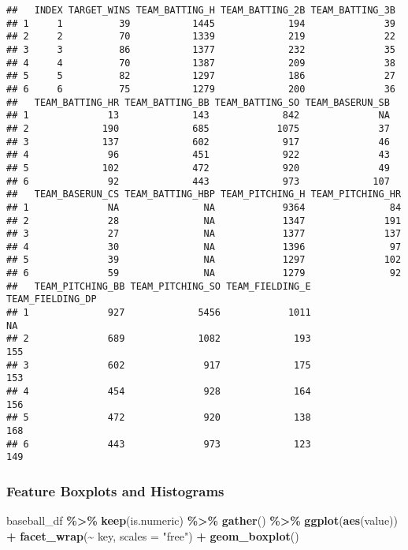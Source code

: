 \documentclass[
]{article}
\newenvironment{Shaded}{\begin{snugshade}}{\end{snugshade}}
\newcommand{\DataTypeTok}[1]{\textcolor[rgb]{0.13,0.29,0.53}{#1}}
\newcommand{\KeywordTok}[1]{\textcolor[rgb]{0.13,0.29,0.53}{\textbf{#1}}}
\newcommand{\NormalTok}[1]{#1}
\newcommand{\OperatorTok}[1]{\textcolor[rgb]{0.81,0.36,0.00}{\textbf{#1}}}
\newcommand{\StringTok}[1]{\textcolor[rgb]{0.31,0.60,0.02}{#1}}
\begin{document}
\begin{verbatim}
##   INDEX TARGET_WINS TEAM_BATTING_H TEAM_BATTING_2B TEAM_BATTING_3B
## 1     1          39           1445             194              39
## 2     2          70           1339             219              22
## 3     3          86           1377             232              35
## 4     4          70           1387             209              38
## 5     5          82           1297             186              27
## 6     6          75           1279             200              36
##   TEAM_BATTING_HR TEAM_BATTING_BB TEAM_BATTING_SO TEAM_BASERUN_SB
## 1              13             143             842              NA
## 2             190             685            1075              37
## 3             137             602             917              46
## 4              96             451             922              43
## 5             102             472             920              49
## 6              92             443             973             107
##   TEAM_BASERUN_CS TEAM_BATTING_HBP TEAM_PITCHING_H TEAM_PITCHING_HR
## 1              NA               NA            9364               84
## 2              28               NA            1347              191
## 3              27               NA            1377              137
## 4              30               NA            1396               97
## 5              39               NA            1297              102
## 6              59               NA            1279               92
##   TEAM_PITCHING_BB TEAM_PITCHING_SO TEAM_FIELDING_E TEAM_FIELDING_DP
## 1              927             5456            1011               NA
## 2              689             1082             193              155
## 3              602              917             175              153
## 4              454              928             164              156
## 5              472              920             138              168
## 6              443              973             123              149
\end{verbatim}

\hypertarget{feature-boxplots-and-histograms}{%
\subsubsection{Feature Boxplots and
Histograms}\label{feature-boxplots-and-histograms}}

\begin{Shaded}
\begin{Highlighting}[]
\NormalTok{baseball\_df }\OperatorTok{\%\textgreater{}\%}
\StringTok{  }\KeywordTok{keep}\NormalTok{(is.numeric) }\OperatorTok{\%\textgreater{}\%}
\StringTok{  }\KeywordTok{gather}\NormalTok{() }\OperatorTok{\%\textgreater{}\%}\StringTok{ }
\StringTok{  }\KeywordTok{ggplot}\NormalTok{(}\KeywordTok{aes}\NormalTok{(value)) }\OperatorTok{+}
\StringTok{    }\KeywordTok{facet\_wrap}\NormalTok{(}\OperatorTok{\textasciitilde{}}\StringTok{ }\NormalTok{key, }\DataTypeTok{scales =} \StringTok{"free"}\NormalTok{) }\OperatorTok{+}
\StringTok{    }\KeywordTok{geom\_boxplot}\NormalTok{()}
\end{Highlighting}
\end{Shaded}
\end{document}
